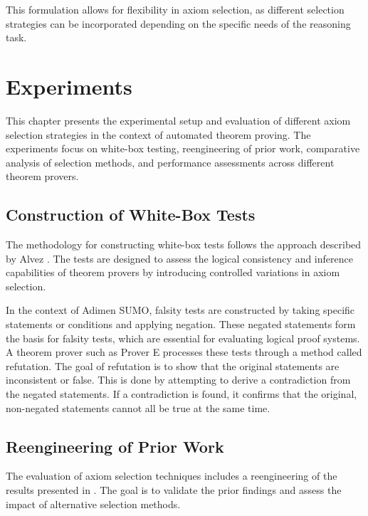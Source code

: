 \documentclass[english,version-2020-11]{uzl-thesis}
\begin{document}
This formulation allows for flexibility in axiom selection, as different selection strategies can be incorporated depending on the specific needs of the reasoning task.


\chapter{Experiments}
\label{chapter-experiments}

This chapter presents the experimental setup and evaluation of different axiom selection strategies in the context of automated theorem proving. The experiments focus on white-box testing, reengineering of prior work, comparative analysis of selection methods, and performance assessments across different theorem provers.

\section{Construction of White-Box Tests}

The methodology for constructing white-box tests follows the approach described by Alvez \cite{Alvez2017}. The tests are designed to assess the logical consistency and inference capabilities of theorem provers by introducing controlled variations in axiom selection.

In the context of Adimen SUMO, falsity tests are constructed by taking specific statements or conditions and applying negation. These negated statements form the basis for falsity tests, which are essential for evaluating logical proof systems. A theorem prover such as Prover E processes these tests through a method called refutation. The goal of refutation is to show that the original statements are inconsistent or false. This is done by attempting to derive a contradiction from the negated statements. If a contradiction is found, it confirms that the original, non-negated statements cannot all be true at the same time.

\section{Reengineering of Prior Work}

The evaluation of axiom selection techniques includes a reengineering of the results presented in \cite{Schon2024}. The goal is to validate the prior findings and assess the impact of alternative selection methods.
\end{document}
